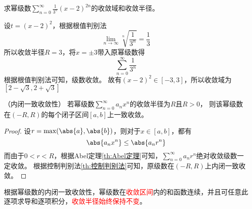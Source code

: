 \begin{example}
    求幂级数$\displaystyle \sum_{n=0}^\infty \frac{1}{3^n}(x-2)^{2n}$的收敛域和收敛半径。
\end{example}
\begin{solution}
    设$t=(x-2)^2$，根据根值判别法
    \[ \lim_{n\to\infty} \sqrt[n]{\frac{1}{3^n}}=\frac{1}{3} \]
    所以收敛半径$R=3$，将$x =\pm 3$带入原幂级数得
    \[ \sum_{n=0}^\infty \frac{1}{3^n} \]
    根据根值判别法可知，级数收敛。
    故有$(x-2)^2 \in [-3,3]$，所以收敛域为$[2-\sqrt{3},2+\sqrt{3}]$
\end{solution}

\begin{theorem}
    （内闭一致收敛性）
    \label{th:内闭一致收敛性}
    若幂级数$\displaystyle\sum_{n=0}^\infty a_nx^n$的收敛半径为$R$且$R>0$，
    则该幂级数在$(-R,R)$的每个闭子区间$[a,b]$上一致收敛。
\end{theorem}
\begin{proof}
    设$r=\max(\abs{a},\abs{b})$，则对于$x\in[a,b]$，都有
    \[ \abs{a_nx^n} \leq \abs{a_nr^n} \]
    而由于$0<r<R$，根据Abel定理\ref{th:Abel定理}可知，$\displaystyle\sum_{n=0}^\infty a_nr^n$绝对收敛级数一定收敛。
    根据控制判别法\ref{th:控制判别法}可知，原级数在$(-R,R)$上内闭一致收敛。
\end{proof}

根据幂级数的内闭一致收敛性，幂级数在\textcolor{red}{收敛区间}内的和函数连续，并且可任意此逐项求导和逐项积分，\textcolor{red}{收敛半径始终保持不变}。

